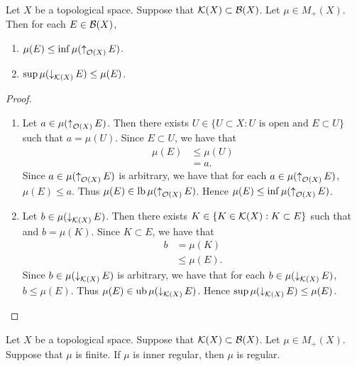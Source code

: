 \documentclass{book}
\begin{document}
	\begin{ex}
		Let $X$ be a topological space. Suppose that $\mathcal{K}(X) \subset \mathcal{B}(X)$. Let $\mu \in M_+(X)$. Then for each $E \in \mathcal{B}(X)$,
		\begin{enumerate}
			\item $\mu(E) \leq \inf \mu(\operatorname{\uparrow}_{\mathcal{O}(X)} E)$.
			\item $\sup \mu(\operatorname{\downarrow}_{\mathcal{K}(X)} E) \leq \mu(E)$.
		\end{enumerate}
	\end{ex}
	
	\begin{proof}\
		\begin{enumerate}
			\item Let $a \in \mu(\operatorname{\uparrow}_{\mathcal{O}(X)} E)$. Then there exists $U \in \{U \subset X: \text{$U$ is open and $E \subset U$}\}$ such that $a = \mu(U)$. Since $E \subset U$, we have that  
			\begin{align*}
				\mu(E)
				& \leq \mu(U) \\
				& = a.
			\end{align*}
			Since $a \in \mu(\operatorname{\uparrow}_{\mathcal{O}(X)} E)$ is arbitrary, we have that for each $a \in \mu(\operatorname{\uparrow}_{\mathcal{O}(X)} E)$, $\mu(E) \leq a$. Thus $\mu(E) \in \operatorname{lb} \mu(\operatorname{\uparrow}_{\mathcal{O}(X)} E)$. Hence $\mu(E) \leq \inf \mu(\operatorname{\uparrow}_{\mathcal{O}(X)} E)$. 
			\item Let $b \in \mu(\operatorname{\downarrow}_{\mathcal{K}(X)} E)$. Then there exists $K \in \{K \in \mathcal{K}(X): K \subset E \}$ such that and $b = \mu(K)$. Since $K \subset E$, we have that 
			\begin{align*}
				b
				& = \mu(K) \\
				& \leq \mu(E).
			\end{align*}
			Since $b \in \mu(\operatorname{\downarrow}_{\mathcal{K}(X)} E)$ is arbitrary, we have that for each $b \in \mu(\operatorname{\downarrow}_{\mathcal{K}(X)} E)$, $b \leq \mu(E)$. Thus $\mu(E) \in \operatorname{ub} \mu(\operatorname{\downarrow}_{\mathcal{K}(X)} E)$. Hence $\sup \mu(\operatorname{\downarrow}_{\mathcal{K}(X)} E) \leq \mu(E)$. 
		\end{enumerate}
	\end{proof}

	\begin{ex} 
		Let $X$ be a topological space. Suppose that $\mathcal{K}(X) \subset \mathcal{B}(X)$. Let $\mu \in M_+(X)$. Suppose that $\mu$ is finite. If $\mu$ is inner regular, then $\mu$ is regular.
	\end{ex}	
\end{document}
